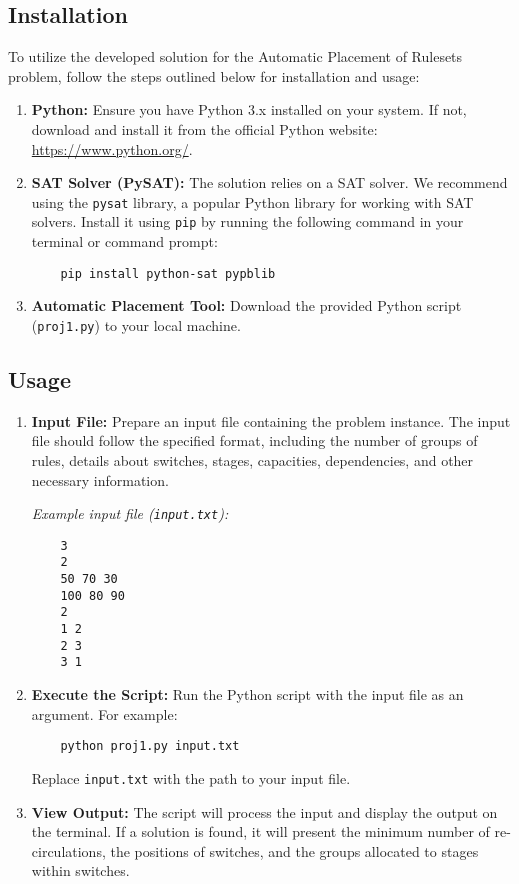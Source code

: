 \subsection{Installation}

To utilize the developed solution for the Automatic Placement of Rulesets problem, follow the steps outlined below for installation and usage:

\begin{enumerate}
    \item \textbf{Python:} Ensure you have Python 3.x installed on your system. If not, download and install it from the official Python website: \url{https://www.python.org/}.

    \item \textbf{SAT Solver (PySAT):} The solution relies on a SAT solver. We recommend using the \texttt{pysat} library, a popular Python library for working with SAT solvers. Install it using \texttt{pip} by running the following command in your terminal or command prompt:

          \begin{verbatim}
    pip install python-sat pypblib
    \end{verbatim}

    \item \textbf{Automatic Placement Tool:} Download the provided Python script (\texttt{proj1.py}) to your local machine.
\end{enumerate}

\subsection{Usage}

\begin{enumerate}
    \item \textbf{Input File:} Prepare an input file containing the problem instance. The input file should follow the specified format, including the number of groups of rules, details about switches, stages, capacities, dependencies, and other necessary information.

          \textit{Example input file (\texttt{input.txt}):}
          \begin{verbatim}
    3
    2
    50 70 30
    100 80 90
    2
    1 2
    2 3
    3 1
    \end{verbatim}

    \item \textbf{Execute the Script:} Run the Python script with the input file as an argument. For example:

          \begin{verbatim}
    python proj1.py input.txt
    \end{verbatim}

          Replace \texttt{input.txt} with the path to your input file.

    \item \textbf{View Output:} The script will process the input and display the output on the terminal. If a solution is found, it will present the minimum number of re-circulations, the positions of switches, and the groups allocated to stages within switches.
\end{enumerate}

